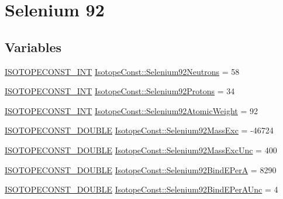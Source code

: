 \hypertarget{group___isotope_const-_selenium-_se92}{}\section{Selenium 92}
\label{group___isotope_const-_selenium-_se92}
\subsection*{Variables}
\begin{DoxyCompactItemize}
\item 
\mbox{\hyperlink{group___isotope_const-_macros_ga5f18360b3e99483a35c32d789e62621c}{I\+S\+O\+T\+O\+P\+E\+C\+O\+N\+S\+T\+\_\+\+I\+NT}} \mbox{\hyperlink{group___isotope_const-_selenium-_se92_ga107d35fa82d626f1ff6c3620ce74a6e6}{Isotope\+Const\+::\+Selenium92\+Neutrons}} = 58
\item 
\mbox{\hyperlink{group___isotope_const-_macros_ga5f18360b3e99483a35c32d789e62621c}{I\+S\+O\+T\+O\+P\+E\+C\+O\+N\+S\+T\+\_\+\+I\+NT}} \mbox{\hyperlink{group___isotope_const-_selenium-_se92_ga89e53d72399eeae8fc7c0f737552fd6f}{Isotope\+Const\+::\+Selenium92\+Protons}} = 34
\item 
\mbox{\hyperlink{group___isotope_const-_macros_ga5f18360b3e99483a35c32d789e62621c}{I\+S\+O\+T\+O\+P\+E\+C\+O\+N\+S\+T\+\_\+\+I\+NT}} \mbox{\hyperlink{group___isotope_const-_selenium-_se92_ga681d36e4a26568caa0923346c6eacfeb}{Isotope\+Const\+::\+Selenium92\+Atomic\+Weight}} = 92
\item 
\mbox{\hyperlink{group___isotope_const-_macros_ga8f45a7272ce02c0b4c65c44636ed719a}{I\+S\+O\+T\+O\+P\+E\+C\+O\+N\+S\+T\+\_\+\+D\+O\+U\+B\+LE}} \mbox{\hyperlink{group___isotope_const-_selenium-_se92_ga4f50ae79b3aa28dcf41e519784092574}{Isotope\+Const\+::\+Selenium92\+Mass\+Exc}} = -\/46724
\item 
\mbox{\hyperlink{group___isotope_const-_macros_ga8f45a7272ce02c0b4c65c44636ed719a}{I\+S\+O\+T\+O\+P\+E\+C\+O\+N\+S\+T\+\_\+\+D\+O\+U\+B\+LE}} \mbox{\hyperlink{group___isotope_const-_selenium-_se92_ga73cae0c6e8611059b3af2f4633fac6d7}{Isotope\+Const\+::\+Selenium92\+Mass\+Exc\+Unc}} = 400
\item 
\mbox{\hyperlink{group___isotope_const-_macros_ga8f45a7272ce02c0b4c65c44636ed719a}{I\+S\+O\+T\+O\+P\+E\+C\+O\+N\+S\+T\+\_\+\+D\+O\+U\+B\+LE}} \mbox{\hyperlink{group___isotope_const-_selenium-_se92_ga1db6e0015f0a33933fc57b9bff1d038b}{Isotope\+Const\+::\+Selenium92\+Bind\+E\+PerA}} = 8290
\item 
\mbox{\hyperlink{group___isotope_const-_macros_ga8f45a7272ce02c0b4c65c44636ed719a}{I\+S\+O\+T\+O\+P\+E\+C\+O\+N\+S\+T\+\_\+\+D\+O\+U\+B\+LE}} \mbox{\hyperlink{group___isotope_const-_selenium-_se92_ga22f8d42e68c7758f95e5e36c1ae9ded3}{Isotope\+Const\+::\+Selenium92\+Bind\+E\+Per\+A\+Unc}} = 4

\end{DoxyCompactItemize}
